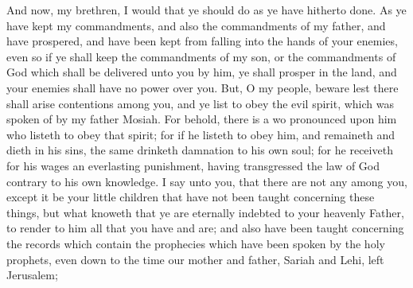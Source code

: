 \bverse \iffalse And now, my brethren, I would that ye should do as ye have hitherto done. As ye have kept my commandments, and also the commandments of my father, and have prospered, and have been kept from falling into the hands of your enemies, even so if ye shall keep the commandments of my son, or the commandments of God which shall be delivered unto you by him, ye shall prosper in the land, and your enemies shall have no power over you. \fi
And now, my brethren, I would that ye should do as ye have hitherto done. As ye have kept my commandments, and also the commandments of my father, and have prospered, and have been kept from falling into the hands of your enemies, even so if ye shall keep the commandments of my son, or the commandments of God which shall be delivered unto you by him, ye shall prosper in the land, and your enemies shall have no power over you.
\bverse \iffalse But, O my people, beware lest there shall arise contentions among you, and ye list to obey the evil spirit, which was spoken of by my father Mosiah. \fi
But, O my people, beware lest there shall arise contentions among you, and ye list to obey the evil spirit, which was spoken of by my father Mosiah.
\bverse \iffalse For behold, there is a wo pronounced upon him who listeth to obey that spirit; for if he listeth to obey him, and remaineth and dieth in his sins, the same drinketh damnation to his own soul; for he receiveth for his wages an everlasting punishment, having transgressed the law of God contrary to his own knowledge. \fi
For behold, there is a wo pronounced upon him who listeth to obey that spirit; for if he listeth to obey him, and remaineth and dieth in his sins, the same drinketh damnation to his own soul; for he receiveth for his wages an everlasting punishment, having transgressed the law of God contrary to his own knowledge.
\bverse \iffalse I say unto you, that there are not any among you, except it be your little children that have not been taught concerning these things, but what knoweth that ye are eternally indebted to your heavenly Father, to render to him all that you have and are; and also have been taught concerning the records which contain the prophecies which have been spoken by the holy prophets, even down to the time our father, Lehi, left Jerusalem; \fi
I say unto you, that there are not any among you, except it be your little children that have not been taught concerning these things, but what knoweth that ye are eternally indebted to your heavenly Father, to render to him all that you have and are; and also have been taught concerning the records which contain the prophecies which have been spoken by the holy prophets, even down to the time our mother and father, Sariah and Lehi, left Jerusalem;
